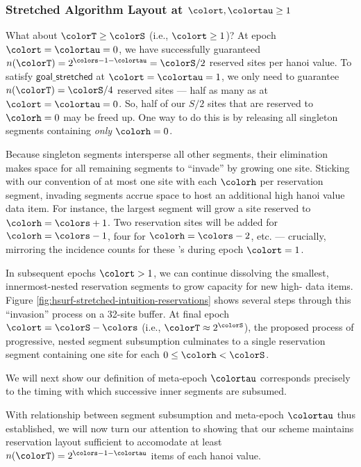 \subsubsection{Stretched Algorithm Layout at $\colort,\colortau\geq1$}

What about $\colorT \geq \colorS$ (i.e., $\colort \geq 1$)?
At epoch $\colort=\colortau=0$, we have successfully guaranteed $n(\colorT) = 2^{\colors - 1 - \colortau} = \colorS / 2$ reserved sites per hanoi value.
To satisfy $\textsf{goal\_stretched}$ at $\colort=\colortau=1$, we only need to guarantee $n(\colorT) = \colorS/4$ reserved sites --- half as many as at $\colort=\colortau=0$.
So, half of our $S/2$ sites that are reserved to \hv{} $\colorh=0$ may be freed up.
One way to do this is by releasing all singleton segments containing \textit{only} \hv{} $\colorh=0$.

Because singleton segments intersperse all other segments, their elimination makes space for all remaining segments to ``invade'' by growing one site.
Sticking with our convention of at most one site with each \hv{} $\colorh$ per reservation segment, invading segments accrue space to host an additional high hanoi value data item.
For instance, the largest segment will grow a site reserved to \hv{} $\colorh=\colors +1$.
Two reservation sites will be added for \hv{} $\colorh=\colors - 1$, four for \hv{} $\colorh=\colors - 2$, etc. --- crucially, mirroring the incidence counts for these \hv{}'s during epoch $\colort=1$.

In subsequent epochs $\colort>1$, we can continue dissolving the smallest, innermost-nested reservation segments to grow capacity for new high-\hv{} data items.
Figure \ref{fig:hsurf-stretched-intuition-reservations} shows several steps through this ``invasion'' process on a 32-site buffer.
At final epoch $\colort=\colorS-\colors$ (i.e., $\colorT \approx 2^{\colorS}$), the proposed process of progressive, nested segment subsumption culminates to a single reservation segment containing one site for each \hv{} $0 \leq \colorh < \colorS$.

We will next show our definition of meta-epoch $\colortau$ corresponds precisely to the timing with which successive inner segments are subsumed.



With relationship between segment subsumption and meta-epoch $\colortau$ thus established, we will now turn our attention to showing that our scheme maintains reservation layout sufficient to accomodate at least $n(\colorT) = 2^{\colors - 1 - \colortau}$ items of each hanoi value.

